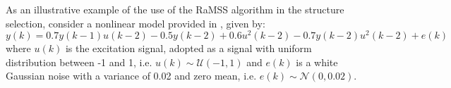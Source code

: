 \begin{exmp}
  \label{ex:varHeater}

  As an illustrative example of the use of the RaMSS algorithm in the structure selection, consider a nonlinear model provided in \cite{baldacchino2013}, given by:
  \begin{equation}
    y(k) = 0.7y(k-1)u(k-2) - 0.5y(k-2) + 0.6u^2(k-2) - 0.7y(k-2)u^2(k-2) + e(k)
  \label{eq:}
  \end{equation}
  where $u(k)$ is the excitation signal, adopted as a signal with uniform distribution between -1 and 1, i.e. $u(k) \sim \mathcal{U}(-1,1) $ and $e(k)$ is a white Gaussian noise with a variance of 0.02  and zero mean, i.e. $e(k) \sim \mathcal{N}(0,0.02)$.


\end{exmp}
